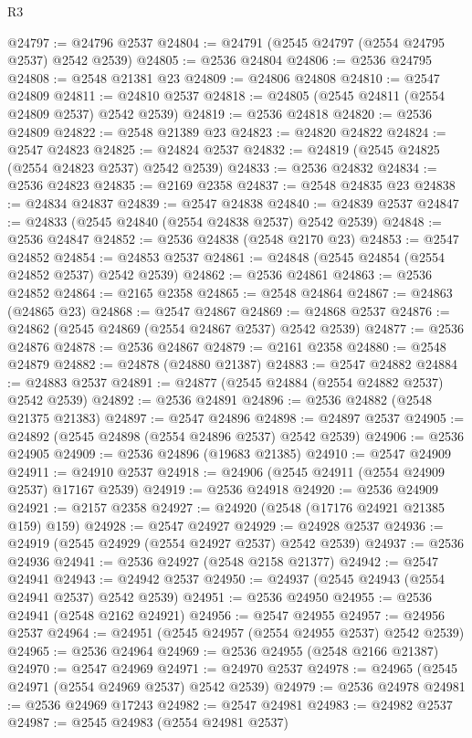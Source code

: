 \begin{lexlean}{R3}
\begin{coremodule}
@24797 := @24796 @2537
@24804 := @24791 (@2545 @24797 (@2554 @24795 @2537) @2542 @2539)
@24805 := @2536 @24804
@24806 := @2536 @24795
@24808 := @2548 @21381 @23
@24809 := @24806 @24808
@24810 := @2547 @24809
@24811 := @24810 @2537
@24818 := @24805 (@2545 @24811 (@2554 @24809 @2537) @2542 @2539)
@24819 := @2536 @24818
@24820 := @2536 @24809
@24822 := @2548 @21389 @23
@24823 := @24820 @24822
@24824 := @2547 @24823
@24825 := @24824 @2537
@24832 := @24819 (@2545 @24825 (@2554 @24823 @2537) @2542 @2539)
@24833 := @2536 @24832
@24834 := @2536 @24823
@24835 := @2169 @2358
@24837 := @2548 @24835 @23
@24838 := @24834 @24837
@24839 := @2547 @24838
@24840 := @24839 @2537
@24847 := @24833 (@2545 @24840 (@2554 @24838 @2537) @2542 @2539)
@24848 := @2536 @24847
@24852 := @2536 @24838 (@2548 @2170 @23)
@24853 := @2547 @24852
@24854 := @24853 @2537
@24861 := @24848 (@2545 @24854 (@2554 @24852 @2537) @2542 @2539)
@24862 := @2536 @24861
@24863 := @2536 @24852
@24864 := @2165 @2358
@24865 := @2548 @24864
@24867 := @24863 (@24865 @23)
@24868 := @2547 @24867
@24869 := @24868 @2537
@24876 := @24862 (@2545 @24869 (@2554 @24867 @2537) @2542 @2539)
@24877 := @2536 @24876
@24878 := @2536 @24867
@24879 := @2161 @2358
@24880 := @2548 @24879
@24882 := @24878 (@24880 @21387)
@24883 := @2547 @24882
@24884 := @24883 @2537
@24891 := @24877 (@2545 @24884 (@2554 @24882 @2537) @2542 @2539)
@24892 := @2536 @24891
@24896 := @2536 @24882 (@2548 @21375 @21383)
@24897 := @2547 @24896
@24898 := @24897 @2537
@24905 := @24892 (@2545 @24898 (@2554 @24896 @2537) @2542 @2539)
@24906 := @2536 @24905
@24909 := @2536 @24896 (@19683 @21385)
@24910 := @2547 @24909
@24911 := @24910 @2537
@24918 := @24906 (@2545 @24911 (@2554 @24909 @2537) @17167 @2539)
@24919 := @2536 @24918
@24920 := @2536 @24909
@24921 := @2157 @2358
@24927 := @24920 (@2548 (@17176 @24921 @21385 @159) @159)
@24928 := @2547 @24927
@24929 := @24928 @2537
@24936 := @24919 (@2545 @24929 (@2554 @24927 @2537) @2542 @2539)
@24937 := @2536 @24936
@24941 := @2536 @24927 (@2548 @2158 @21377)
@24942 := @2547 @24941
@24943 := @24942 @2537
@24950 := @24937 (@2545 @24943 (@2554 @24941 @2537) @2542 @2539)
@24951 := @2536 @24950
@24955 := @2536 @24941 (@2548 @2162 @24921)
@24956 := @2547 @24955
@24957 := @24956 @2537
@24964 := @24951 (@2545 @24957 (@2554 @24955 @2537) @2542 @2539)
@24965 := @2536 @24964
@24969 := @2536 @24955 (@2548 @2166 @21387)
@24970 := @2547 @24969
@24971 := @24970 @2537
@24978 := @24965 (@2545 @24971 (@2554 @24969 @2537) @2542 @2539)
@24979 := @2536 @24978
@24981 := @2536 @24969 @17243
@24982 := @2547 @24981
@24983 := @24982 @2537
@24987 := @2545 @24983 (@2554 @24981 @2537)

\end{coremodule}
\end{lexlean}
